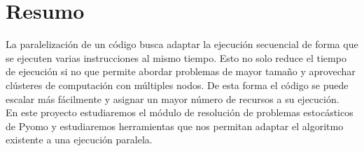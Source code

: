 \pagestyle{plain}
\chapter*{Resumo}

La paralelización de un código busca adaptar la ejecución secuencial de forma que se ejecuten varias instrucciones al mismo tiempo. Esto no solo reduce el tiempo de ejecución si no que permite abordar problemas de mayor tamaño y aprovechar clústeres de computación con múltiples nodos. De esta forma el código se puede escalar más fácilmente y asignar un mayor número de recursos a su ejecución.\\

En este proyecto estudiaremos el módulo de resolución de problemas estocásticos de Pyomo y estudiaremos herramientas que nos permitan adaptar el algoritmo existente a una ejecución paralela.